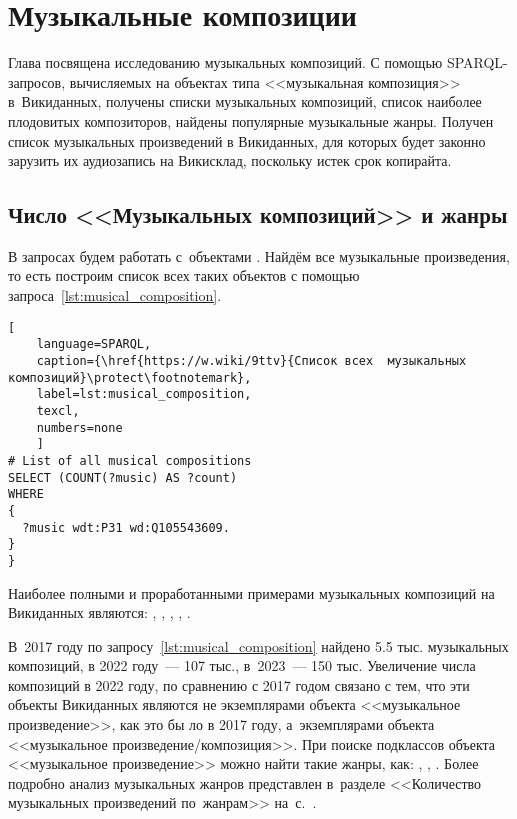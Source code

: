 \chapter{Музыкальные композиции}
\label{ch:musical-composition}
Глава посвящена исследованию музыкальных композиций. 
С помощью SPARQL-запросов, вычисляемых на объектах типа <<музыкальная композиция>> в~Викиданных, 
получены списки музыкальных композиций, список наиболее плодовитых композиторов, 
найдены популярные музыкальные жанры. 
Получен список музыкальных произведений в Викиданных, 
для которых будет законно зарузить их аудиозапись на Викисклад, поскольку истек срок копирайта.

\section{Число <<Музыкальных композиций>> и жанры}

В запросах будем работать с~объектами . 
Найдём все музыкальные произведения, то есть 
построим список всех таких объектов с помощью запроса~\ref{lst:musical_composition}.

\begin{lstlisting}[ 
    language=SPARQL,
    caption={\href{https://w.wiki/9ttv}{Список всех  музыкальных композиций}\protect\footnotemark},
    label=lst:musical_composition,
    texcl,
    numbers=none
    ]
# List of all musical compositions
SELECT (COUNT(?music) AS ?count)
WHERE
{
  ?music wdt:P31 wd:Q105543609.
}
}
\end{lstlisting}%

Наиболее полными и проработанными примерами музыкальных композиций на Викиданных являются: 
, 
, 
, 
, 
.

В~2017 году по запросу~\ref{lst:musical_composition} найдено \num{5,5} тыс. музыкальных композиций, 
в 2022 году~--- 107 тыс., в~2023~--- 150 тыс. 
Увеличение числа композиций в 2022 году, по сравнению с 2017 годом связано с тем, 
что эти объекты Викиданных являются не экземплярами объекта <<музыкальное произведение>>, как это бы ло в 2017 году, 
а~экземплярами объекта <<музыкальное произведение/композиция>>. 
При поиске подклассов объекта <<музыкальное произведение>> можно найти такие жанры, как: 
, 
, 
. 
Более подробно анализ музыкальных жанров представлен в~разделе 
<<Количество музыкальных произведений по~жанрам>> на~с.~\pageref{chapter:Number-of-musical-works-by-genre}.


